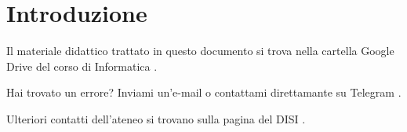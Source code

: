 \section*{Introduzione}

Il materiale didattico trattato in questo documento si trova nella cartella Google Drive del corso di Informatica %
\href{https://bit.ly/drive-folder}{\ExternalLink}.

\medskip
Hai trovato un errore? Inviami un'e-mail \href{mailto:emanuele.nardi@studenti.unitn.it}{\ExternalLink} o contattami direttamante su Telegram \href{https://t.me/emanuelenardi}{\ExternalLink}.

\medskip
Ulteriori contatti dell'ateneo si trovano sulla pagina del DISI %
\href{http://offertaformativa.unitn.it/it/l/informatica/contatti-e-referenti}{\ExternalLink}.

\tableofcontents					%
\lstlistoflistings					%
\listoffigures						%
\listoftables						%

\newpage
\listoftodos[Note]					%
